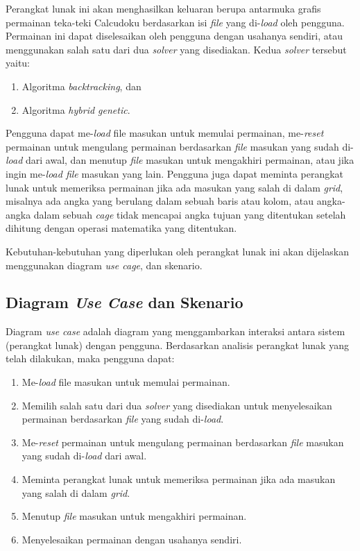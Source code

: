 Perangkat lunak ini akan menghasilkan keluaran berupa antarmuka grafis permainan teka-teki Calcudoku berdasarkan isi \textit{file}  yang di-\textit{load} oleh pengguna. Permainan ini dapat diselesaikan oleh pengguna dengan usahanya sendiri, atau menggunakan salah satu dari dua \textit{solver} yang disediakan.  Kedua \textit{solver} tersebut yaitu:

\begin{enumerate}
\item Algoritma \textit{backtracking}, dan
\item Algoritma \textit{hybrid genetic}.
\end{enumerate}

Pengguna dapat me-\textit{load} file masukan untuk memulai permainan, me-\textit{reset} permainan untuk mengulang permainan berdasarkan \textit{file} masukan yang sudah di-\textit{load} dari awal, dan menutup \textit{file} masukan untuk mengakhiri permainan, atau jika ingin me-\textit{load file} masukan yang lain. Pengguna juga dapat meminta perangkat lunak untuk memeriksa permainan jika ada masukan yang salah di dalam \textit{grid}, misalnya ada angka yang berulang dalam sebuah baris atau kolom, atau angka-angka dalam sebuah \textit{cage} tidak mencapai angka tujuan yang ditentukan setelah dihitung dengan operasi matematika yang ditentukan.

Kebutuhan-kebutuhan yang diperlukan oleh perangkat lunak ini akan dijelaskan menggunakan diagram \textit{use cage}, dan skenario.

\subsection{Diagram \textit{Use Case} dan Skenario}
\label{sec:analisisusecase}

Diagram \textit{use case} adalah diagram yang menggambarkan interaksi antara sistem (perangkat lunak) dengan pengguna. Berdasarkan analisis perangkat lunak yang telah dilakukan, maka pengguna dapat:

\begin{enumerate}
\item Me-\textit{load} file masukan untuk memulai permainan.
\item Memilih salah satu dari dua \textit{solver} yang disediakan untuk menyelesaikan permainan berdasarkan \textit{file} yang sudah di-\textit{load}.
\item Me-\textit{reset} permainan untuk mengulang permainan berdasarkan \textit{file} masukan yang sudah di-\textit{load} dari awal.
\item Meminta perangkat lunak untuk memeriksa permainan jika ada masukan yang salah di dalam \textit{grid}.
\item Menutup \textit{file} masukan untuk mengakhiri permainan.
\item Menyelesaikan permainan dengan usahanya sendiri.
\end{enumerate}

